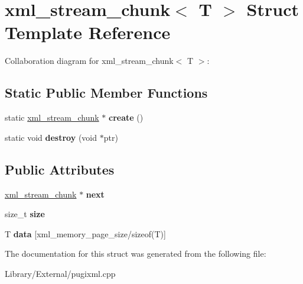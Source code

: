 \hypertarget{structxml__stream__chunk}{}\section{xml\+\_\+stream\+\_\+chunk$<$ T $>$ Struct Template Reference}
\label{structxml__stream__chunk}


Collaboration diagram for xml\+\_\+stream\+\_\+chunk$<$ T $>$\+:
\subsection*{Static Public Member Functions}
\begin{DoxyCompactItemize}
\item 
\hypertarget{structxml__stream__chunk_a92cffe33c529ff266329fd4afb59226d}{}static \hyperlink{structxml__stream__chunk}{xml\+\_\+stream\+\_\+chunk} $\ast$ {\bfseries create} ()\label{structxml__stream__chunk_a92cffe33c529ff266329fd4afb59226d}

\item 
\hypertarget{structxml__stream__chunk_a4b812901d59950d48d539e5c8726a0e8}{}static void {\bfseries destroy} (void $\ast$ptr)\label{structxml__stream__chunk_a4b812901d59950d48d539e5c8726a0e8}

\end{DoxyCompactItemize}
\subsection*{Public Attributes}
\begin{DoxyCompactItemize}
\item 
\hypertarget{structxml__stream__chunk_ad00071f7340adb2bde7c4157d4100b3c}{}\hyperlink{structxml__stream__chunk}{xml\+\_\+stream\+\_\+chunk} $\ast$ {\bfseries next}\label{structxml__stream__chunk_ad00071f7340adb2bde7c4157d4100b3c}

\item 
\hypertarget{structxml__stream__chunk_a42618ba3b7bda1246cfc640149fc34eb}{}size\+\_\+t {\bfseries size}\label{structxml__stream__chunk_a42618ba3b7bda1246cfc640149fc34eb}

\item 
\hypertarget{structxml__stream__chunk_a365e2e228a0277467b25a0fea42b8518}{}T {\bfseries data} \mbox{[}xml\+\_\+memory\+\_\+page\+\_\+size/sizeof(T)\mbox{]}\label{structxml__stream__chunk_a365e2e228a0277467b25a0fea42b8518}

\end{DoxyCompactItemize}


The documentation for this struct was generated from the following file\+:\begin{DoxyCompactItemize}
\item 
Library/\+External/pugixml.\+cpp\end{DoxyCompactItemize}
